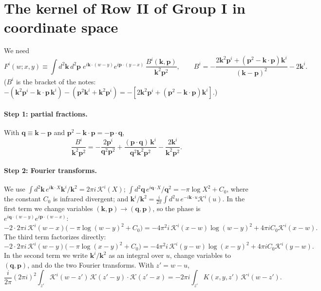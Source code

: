 \documentclass[10pt]{article}
\numberwithin{equation}{section}
\newcommand{\KK}{\mathcal K}
\begin{document}
\appendix
\section{The kernel of Row II of Group I in coordinate space}\label{app:F}

We need
\begin{equation}
F^i(w;x,y)\equiv\int d^2\mathbf k\,d^2\mathbf p\;e^{i\mathbf k\cdot(w-y)}e^{i\mathbf p\cdot(y-x)}\,\frac{B^i(\mathbf k,\mathbf p)}{\mathbf k^2\mathbf p^2},\qquad
B^i=-\frac{2\mathbf k^2\mathbf p^i+(\mathbf p^2-\mathbf k\cdot\mathbf p)\mathbf k^i}{(\mathbf k-\mathbf p)^2}-2\mathbf k^i .
\end{equation}
($B^i$ is the bracket of the notes: $-(\mathbf k^2\mathbf p^i-\mathbf k\cdot\mathbf p\,\mathbf k^i)-(\mathbf p^2\mathbf k^i+\mathbf k^2\mathbf p^i)=-[2\mathbf k^2\mathbf p^i+(\mathbf p^2-\mathbf k\cdot\mathbf p)\mathbf k^i]$.)

\paragraph{Step 1: partial fractions.} With $\mathbf q\equiv\mathbf k-\mathbf p$ and $\mathbf p^2-\mathbf k\cdot\mathbf p=-\mathbf p\cdot\mathbf q$,
\begin{equation}
\frac{B^i}{\mathbf k^2\mathbf p^2}=-\frac{2\mathbf p^i}{\mathbf q^2\mathbf p^2}+\frac{(\mathbf p\cdot\mathbf q)\,\mathbf k^i}{\mathbf q^2\mathbf k^2\mathbf p^2}-\frac{2\mathbf k^i}{\mathbf k^2\mathbf p^2}.
\end{equation}
\paragraph{Step 2: Fourier transforms.} We use $\int d^2\mathbf k\,e^{i\mathbf k\cdot X}\mathbf k^i/\mathbf k^2=2\pi i\,\KK^i(X)$; $\int d^2\mathbf q\,e^{i\mathbf q\cdot X}/\mathbf q^2=-\pi\log X^2+C_0$, where the constant $C_0$ is infrared divergent; and $\mathbf k^i/\mathbf k^2=\frac{i}{2\pi}\int d^2u\,e^{-i\mathbf k\cdot u}\KK^i(u)$. In the first term we change variables $(\mathbf k,\mathbf p)\to(\mathbf q,\mathbf p)$, so the phase is $e^{i\mathbf q\cdot(w-y)}e^{i\mathbf p\cdot(w-x)}$:
\begin{equation}
-2\cdot2\pi i\,\KK^i(w-x)\big(-\pi\log(w-y)^2+C_0\big)=-4\pi^2 i\,\KK^i(x-w)\log(w-y)^2+4\pi iC_0\KK^i(x-w).
\end{equation}
The third term factorizes directly:
\begin{equation}
-2\cdot2\pi i\,\KK^i(w-y)\big(-\pi\log(x-y)^2+C_0\big)=-4\pi^2 i\,\KK^i(y-w)\log(x-y)^2+4\pi iC_0\KK^i(y-w).
\end{equation}
In the second term we write $\mathbf k^i/\mathbf k^2$ as an integral over $u$, change variables to $(\mathbf q,\mathbf p)$, and do the two Fourier transforms. With $z'=w-u$,
\begin{equation}
\frac{i}{2\pi}(2\pi i)^2\int_{z'}\KK^i(w-z')\,\KK(z'-y)\cdot\KK(z'-x)=-2\pi i\int_{z'}K(x,y,z')\,\KK^i(w-z').
\end{equation}
\end{document}
